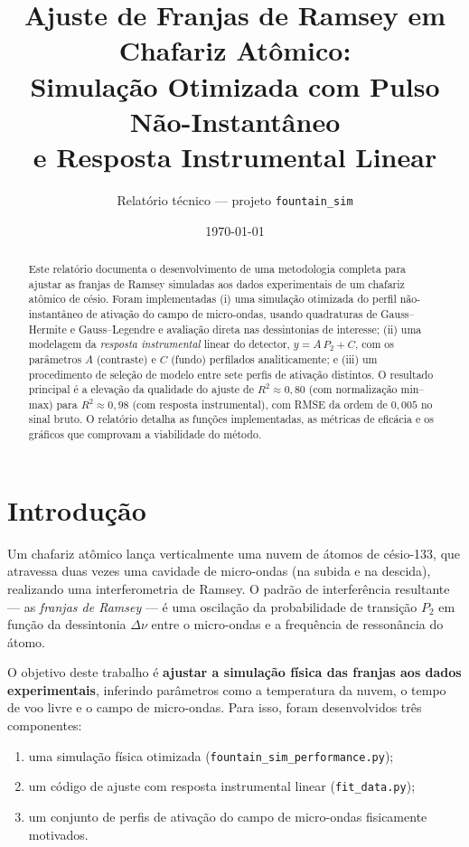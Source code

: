 \documentclass[12pt,a4paper]{article}
\title{\textbf{Ajuste de Franjas de Ramsey em Chafariz Atômico:\\ Simulação Otimizada com Pulso Não-Instantâneo\\ e Resposta Instrumental Linear}}
\author{Relatório técnico — projeto \texttt{fountain\_sim}}
\date{\today}
\begin{document}
\maketitle

\begin{abstract}
Este relatório documenta o desenvolvimento de uma metodologia completa para ajustar as
franjas de Ramsey simuladas aos dados experimentais de um chafariz atômico de césio.
Foram implementadas (i) uma simulação otimizada do perfil não-instantâneo de ativação do
campo de micro-ondas, usando quadraturas de Gauss--Hermite e Gauss--Legendre e avaliação
direta nas dessintonias de interesse; (ii) uma modelagem da \emph{resposta instrumental}
linear do detector, $y = A\,P_2 + C$, com os parâmetros $A$ (contraste) e $C$ (fundo)
perfilados analiticamente; e (iii) um procedimento de seleção de modelo entre sete perfis
de ativação distintos. O resultado principal é a elevação da qualidade do ajuste de
$R^2 \approx 0{,}80$ (com normalização min--max) para $R^2 \approx 0{,}98$ (com resposta
instrumental), com RMSE da ordem de $0{,}005$ no sinal bruto. O relatório detalha as
funções implementadas, as métricas de eficácia e os gráficos que comprovam a viabilidade
do método.
\end{abstract}

\tableofcontents

\section{Introdução}
Um chafariz atômico lança verticalmente uma nuvem de átomos de césio-133, que atravessa
duas vezes uma cavidade de micro-ondas (na subida e na descida), realizando uma
interferometria de Ramsey. O padrão de interferência resultante --- as \emph{franjas de
Ramsey} --- é uma oscilação da probabilidade de transição $P_2$ em função da dessintonia
$\Delta\nu$ entre o micro-ondas e a frequência de ressonância do átomo.

O objetivo deste trabalho é \textbf{ajustar a simulação física das franjas aos dados
experimentais}, inferindo parâmetros como a temperatura da nuvem, o tempo de voo livre e o
campo de micro-ondas. Para isso, foram desenvolvidos três componentes:

\begin{enumerate}
  \item uma simulação física otimizada (\texttt{fountain\_sim\_performance.py});
  \item um código de ajuste com resposta instrumental linear (\texttt{fit\_data.py});
  \item um conjunto de perfis de ativação do campo de micro-ondas fisicamente motivados.
\end{enumerate}
\end{document}
